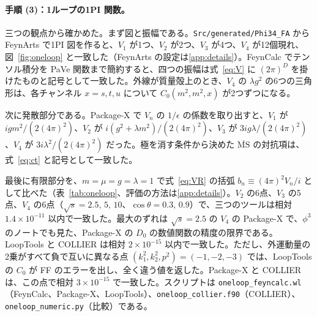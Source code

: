 \documentclass[a4paper,10pt]{ltjsarticle}
\begin{document}
\paragraph{手順 (3)：1ループの1PI 関数。}三つの観点から確かめた。まず図と振幅である。\texttt{Src/generated/Phi34\_FA} から FeynArts で1PI 図を作ると、$V_1$ が1つ、$V_2$ が2つ、$V_3$ が4つ、$V_4$ が12個現れ、図~\ref{fig:oneloop} と一致した（FeynArts の設定は\ref{app:details}）。FeynCalc でテンソル積分を PaVe 関数まで簡約すると、四つの振幅は式~\eqref{eq:V} に $(2\pi)^D$ を掛けたものと記号として一致した。外線が質量殻上のとき、$V_4$ の $\lambda g^2$ の6つの三角形は、各チャンネル $x=s,t,u$ について $C_0(m^2,m^2,x)$ が2つずつになる。

次に発散部分である。Package-X で $V_n$ の $1/\epsilon$ の係数を取り出すと、$V_1$ が $igm^2/(2(4\pi)^2)$、$V_2$ が $i(g^2+\lambda m^2)/(2(4\pi)^2)$、$V_3$ が $3ig\lambda/(2(4\pi)^2)$、$V_4$ が $3i\lambda^2/(2(4\pi)^2)$ だった。極を消す条件から決めた $\overline{\mathrm{MS}}$ の対抗項は、式~\eqref{eq:ct} と記号として一致した。

最後に有限部分を、$m=\mu=g=\lambda=1$ で式~\eqref{eq:VR} の括弧 $b_n\equiv(4\pi)^2V_n/i$ として比べた（表~\ref{tab:oneloop}、評価の方法は\ref{app:details}）。$V_2$ の6点、$V_3$ の5点、$V_4$ の6点（$\sqrt s=2.5,\,5,\,10$、$\cos\theta=0.3,\,0.9$）で、三つのツールは相対 $1.4\times10^{-11}$ 以内で一致した。最大のずれは $\sqrt s=2.5$ の $V_4$ の Package-X で、$\phi^3$ のノートでも見た、Package-X の $D_0$ の数値関数の精度の限界である。LoopTools と COLLIER は相対 $2\times10^{-15}$ 以内で一致した。ただし、外運動量の2乗がすべて負で互いに異なる点 $(k_1^2,k_2^2,p^2)=(-1,-2,-3)$ では、LoopTools の $C_0$ が FF のエラーを出し、全く違う値を返した。Package-X と COLLIER は、この点で相対 $3\times10^{-15}$ で一致した。スクリプトは \texttt{oneloop\_feyncalc.wl}（FeynCalc、Package-X、LoopTools）、\texttt{oneloop\_collier.f90}（COLLIER）、\texttt{oneloop\_numeric.py}（比較）である。
\end{document}
